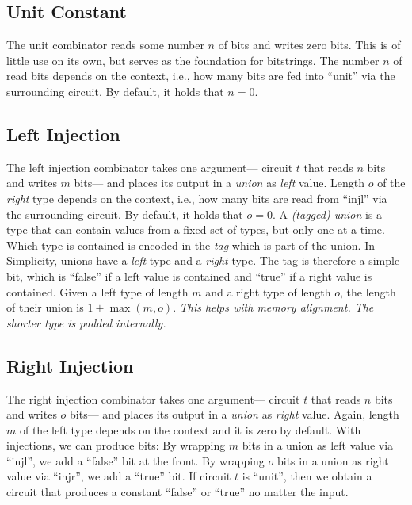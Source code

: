 \subsection{Unit Constant}


%
The unit combinator reads some number $n$ of bits and writes zero bits.
This is of little use on its own,
but serves as the foundation for bitstrings.
%
The number $n$ of read bits depends on the context,
i.e., how many bits are fed into \enquote{unit} via the surrounding circuit.
By default,
it holds that $n = 0$.

\subsection{Left Injection}


%
The left injection combinator takes one argument---%
circuit $t$ that reads $n$ bits and writes $m$ bits---%
and places its output in a \emph{union} as \emph{left} value.
%
Length $o$ of the \emph{right} type depends on the context,
i.e., how many bits are read from \enquote{injl} via the surrounding circuit.
By default, it holds that $o = 0$.
%
A \emph{(tagged) union} is a type that can contain values from a fixed set of types,
but only one at a time.
Which type is contained is encoded in the \emph{tag} which is part of the union.
In Simplicity,
unions have a \emph{left} type and a \emph{right} type.
The tag is therefore a simple bit,
which is \enquote{false} if a left value is contained and \enquote{true} if a right value is contained.
Given a left type of length $m$ and a right type of length $o$,
the length of their union is $1 + \max(m, o)$.
\emph{This helps with memory alignment. The shorter type is padded internally.}

\subsection{Right Injection}


%
The right injection combinator takes one argument---%
circuit $t$ that reads $n$ bits and writes $o$ bits---%
and places its output in a \emph{union} as \emph{right} value.
Again,
length $m$ of the left type depends on the context
and it is zero by default.
%
With injections, we can produce bits:
By wrapping $m$ bits in a union as left value via \enquote{injl},
we add a \enquote{false} bit at the front.
By wrapping $o$ bits in a union as right value via \enquote{injr},
we add a \enquote{true} bit.
If circuit $t$ is \enquote{unit},
then we obtain a circuit that produces a constant \enquote{false} or \enquote{true} no matter the input.

